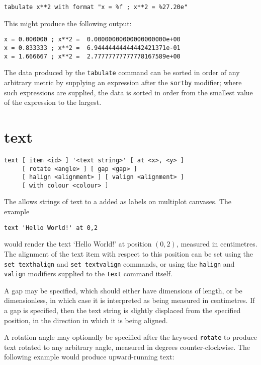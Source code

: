 \begin{verbatim}
tabulate x**2 with format "x = %f ; x**2 = %27.20e"
\end{verbatim}

\noindent This might produce the following output:

\begin{verbatim}
x = 0.000000 ; x**2 =  0.00000000000000000000e+00
x = 0.833333 ; x**2 =  6.94444444444442421371e-01
x = 1.666667 ; x**2 =  2.77777777777778167589e+00
\end{verbatim}

The data produced by the {\tt tabulate} command can be sorted in order of any
arbitrary metric by supplying an expression after the {\tt sortby} modifier;
where such expressions are supplied, the data is sorted in order from the
smallest value of the expression to the largest.


\section{text}

\begin{verbatim}
text [ item <id> ] '<text string>' [ at <x>, <y> ]
     [ rotate <angle> ] [ gap <gap> ]
     [ halign <alignment> ] [ valign <alignment> ]
     [ with colour <colour> ]
\end{verbatim}

The  allows strings of text to a added as labels on multiplot
canvases. The example

\begin{verbatim}
text 'Hello World!' at 0,2
\end{verbatim}

\noindent would render the text `Hello World!' at position $(0,2)$, measured in
centimetres. The alignment of the text item with respect to this position can
be set using the {\tt set texthalign} and {\tt set textvalign} commands, or
using the {\tt halign} and {\tt valign} modifiers supplied to the {\tt text}
command itself.

A gap may be specified, which should either have dimensions of length, or be
dimensionless, in which case it is interpreted as being measured in
centimetres. If a gap is specified, then the text string is slightly displaced
from the specified position, in the direction in which it is being aligned.

A rotation angle may optionally be specified after the keyword {\tt rotate}
to produce text rotated to any arbitrary angle, measured in degrees
counter-clockwise. The following example would produce upward-running text:

